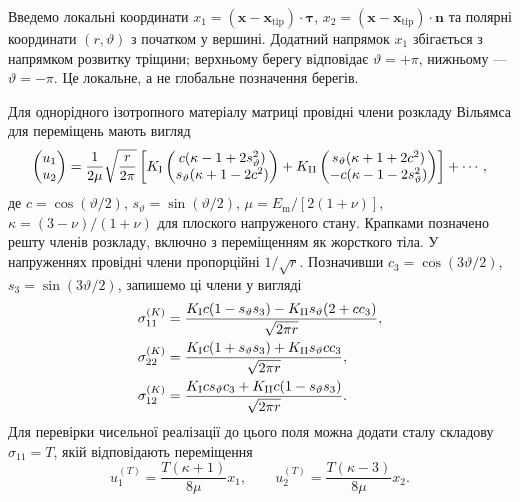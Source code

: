 Введемо локальні координати $x_1=(\boldsymbol x-\boldsymbol x_{\mathrm{tip}})\cdot\boldsymbol\tau$,
$x_2=(\boldsymbol x-\boldsymbol x_{\mathrm{tip}})\cdot\boldsymbol n$ та полярні координати $(r,\vartheta)$ з початком у вершині. Додатний напрямок $x_1$ збігається з напрямком розвитку тріщини; верхньому берегу відповідає $\vartheta=+\pi$, нижньому --- $\vartheta=-\pi$. Це локальне, а не глобальне позначення берегів.

Для однорідного ізотропного матеріалу матриці провідні члени розкладу Вільямса для переміщень мають вигляд
\begin{equation}
 \begin{pmatrix}u_1\\u_2\end{pmatrix}
 =
 \frac{1}{2\mu}\sqrt{\frac{r}{2\pi}}
 \left[
 K_{\mathrm{I}}\begin{pmatrix}
 c(\kappa-1+2s_\vartheta^2)\\
 s_\vartheta(\kappa+1-2c^2)
 \end{pmatrix}
 +
 K_{\mathrm{II}}\begin{pmatrix}
 s_\vartheta(\kappa+1+2c^2)\\
 -c(\kappa-1-2s_\vartheta^2)
 \end{pmatrix}
 \right]+\cdots,
 \label{eq:method-williams-u}
\end{equation}
де $c=\cos(\vartheta/2)$, $s_\vartheta=\sin(\vartheta/2)$,
$\mu=E_{\mathrm m}/[2(1+\nu)]$, $\kappa=(3-\nu)/(1+\nu)$ для плоского напруженого стану. Крапками позначено решту членів розкладу, включно з переміщенням як жорсткого тіла. У напруженнях провідні члени пропорційні $1/\sqrt r$. Позначивши $c_3=\cos(3\vartheta/2)$, $s_3=\sin(3\vartheta/2)$, запишемо ці члени у вигляді
\begin{equation}
 \begin{aligned}
 \sigma_{11}^{(K)}
 &=\frac{K_{\mathrm{I}} c(1-s_\vartheta s_3)
          -K_{\mathrm{II}} s_\vartheta(2+cc_3)}{\sqrt{2\pi r}},\\
 \sigma_{22}^{(K)}
 &=\frac{K_{\mathrm{I}} c(1+s_\vartheta s_3)
          +K_{\mathrm{II}} s_\vartheta c c_3}{\sqrt{2\pi r}},\\
 \sigma_{12}^{(K)}
 &=\frac{K_{\mathrm{I}} c s_\vartheta c_3
          +K_{\mathrm{II}} c(1-s_\vartheta s_3)}{\sqrt{2\pi r}}.
 \end{aligned}
 \label{eq:method-williams-stress}
\end{equation}
Для перевірки чисельної реалізації до цього поля можна додати сталу складову $\sigma_{11}=T$, якій відповідають переміщення
\begin{equation}
 u_1^{(T)}=\frac{T(\kappa+1)}{8\mu}x_1,\qquad
 u_2^{(T)}=\frac{T(\kappa-3)}{8\mu}x_2.
 \label{eq:method-williams-T}
\end{equation}
